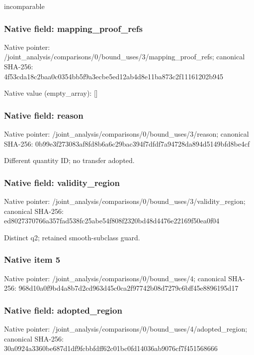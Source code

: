 \documentclass[10pt,a4paper]{article}
\begin{document}
\begingroup\raggedright\sloppy incomparable\par\endgroup

\subsubsection{Native field: mapping\_\allowbreak{}proof\_\allowbreak{}refs}
Native pointer: /joint\_\allowbreak{}analysis/comparisons/0/bound\_\allowbreak{}uses/3/mapping\_\allowbreak{}proof\_\allowbreak{}refs; canonical SHA-256: 4f53cda18c2baa0c0354bb5f9a3ecbe5ed12ab4d8e11ba873c2f11161202b945

Native value (empty\_\allowbreak{}array): []

\subsubsection{Native field: reason}
Native pointer: /joint\_\allowbreak{}analysis/comparisons/0/bound\_\allowbreak{}uses/3/reason; canonical SHA-256: 0b99e3f273083af8fd8b6a6c29bac394f7dfdf7a94728da894d5149bfd8be4cf

\begingroup\raggedright\sloppy Different quantity ID;\allowbreak{} no transfer adopted.\par\endgroup

\subsubsection{Native field: validity\_\allowbreak{}region}
Native pointer: /joint\_\allowbreak{}analysis/comparisons/0/bound\_\allowbreak{}uses/3/validity\_\allowbreak{}region; canonical SHA-256: ed8027370766a357fad538fc25abe54f808f2320bd48d4476e22169f50ea0f04

\begingroup\raggedright\sloppy Distinct q2;\allowbreak{} retained smooth-subclass guard.\par\endgroup

\subsubsection{Native item 5}
Native pointer: /joint\_\allowbreak{}analysis/comparisons/0/bound\_\allowbreak{}uses/4; canonical SHA-256: 968d10a0f9bd4a8b7d2cd963d45c0ca2f97742b08d7279c6bff45e8896195d17

\subsubsection{Native field: adopted\_\allowbreak{}region}
Native pointer: /joint\_\allowbreak{}analysis/comparisons/0/bound\_\allowbreak{}uses/4/adopted\_\allowbreak{}region; canonical SHA-256: 30a0924a3360be687d1df9fcbbfdff62c01bc0fd14036ab9076cf7f451568666
\end{document}
